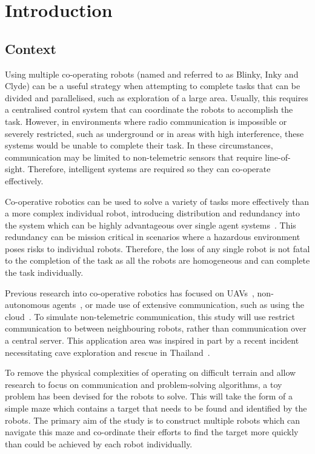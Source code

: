 
\chapter{Introduction}\label{introduction}
\section{Context}\label{introduction/context}
Using multiple co-operating robots (named and referred to as Blinky, Inky
and Clyde) can be a useful strategy when attempting to complete tasks that
can be divided and parallelised, such as exploration of a large area.
Usually, this requires a centralised control system that can
coordinate the robots to accomplish the task. However, in
environments where radio communication is impossible or severely restricted,
such as underground or in areas with high interference, these systems would
be unable to complete their task. In these circumstances, communication may
be limited to non-telemetric sensors that require line-of-sight. Therefore,
intelligent systems are required so they can co-operate effectively.

Co-operative robotics can be used to solve a variety of tasks more 
effectively than a more complex individual robot, introducing distribution
and redundancy into the system which can be highly advantageous over single 
agent systems~\cite{dudek96}. This redundancy can be mission critical in 
scenarios where a hazardous environment poses risks to individual robots. 
Therefore, the loss of any single robot is not fatal to the completion of the task as all
the robots are homogeneous and can complete the task individually.

Previous research into co-operative robotics has focused on UAVs~\cite{khan18},
non-autonomous agents~\cite{jimenez18}, or made use of extensive
communication, such as using the cloud~\cite{wensing2018cooperative}.
To simulate  non-telemetric communication, this study will use restrict
communication to between neighbouring robots, rather than communication over a 
central server. This
application area was inspired in part by a recent incident necessitating cave 
exploration and rescue in Thailand~\cite{bbcthailand}.

To remove the physical complexities of operating on difficult
terrain and allow research to focus on communication and problem-solving 
algorithms, a toy problem has been devised for the robots to solve. This
will take the form of a simple maze which contains a target that needs to
be found and identified by the robots. The primary aim of the study is to
construct multiple robots which can navigate this maze and co-ordinate their
efforts to find the target more quickly than could be achieved by each robot 
individually.

